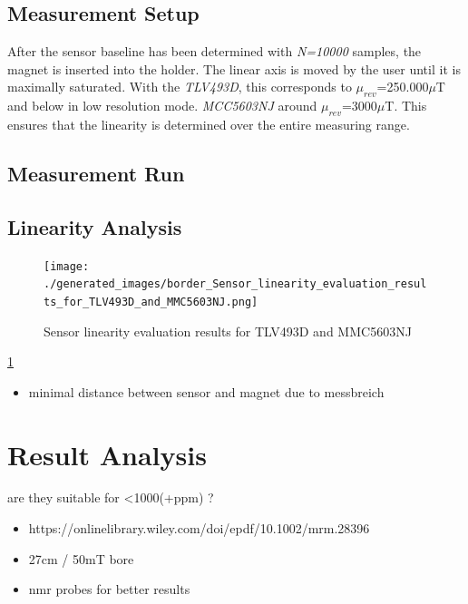 \hypertarget{measurement-setup}{%
\subsection{Measurement Setup}\label{measurement-setup}}

After the sensor baseline has been determined with \emph{N=10000}
samples, the magnet is inserted into the holder. The linear axis is
moved by the user until it is maximally saturated. With the
\emph{TLV493D}, this corresponds to \(\mu_{rev}\)=250.000\(\mu\)T and
below in low resolution mode. \emph{MCC5603NJ} around
\(\mu_{rev}\)=3000\(\mu\)T. This ensures that the linearity is
determined over the entire measuring range.

\hypertarget{measurement-run}{%
\subsection{Measurement Run}\label{measurement-run}}

\hypertarget{linearity-analysis}{%
\subsection{Linearity Analysis}\label{linearity-analysis}}

\begin{figure}
\centering
\texttt{[image: ./generated\_images/border\_Sensor\_linearity\_evaluation\_results\_for\_TLV493D\_and\_MMC5603NJ.png]}
\caption{Sensor linearity evaluation results for TLV493D and MMC5603NJ
\label{Sensor_linearity_evaluation_results_for_TLV493D_and_MMC5603NJ.png}}
\end{figure}

\ref{Sensor_linearity_evaluation_results_for_TLV493D_and_MMC5603NJ.png}

\begin{itemize}
\tightlist
\item
  minimal distance between sensor and magnet due to messbreich
\end{itemize}

\hypertarget{result-analysis-1}{%
\section{Result Analysis}\label{result-analysis-1}}

are they suitable for <1000(+\gls{ppm}) ?

\begin{itemize}
\tightlist
\item
  https://onlinelibrary.wiley.com/doi/epdf/10.1002/mrm.28396
\item
  27cm / 50mT bore
\item
  nmr probes for better results
\end{itemize}

